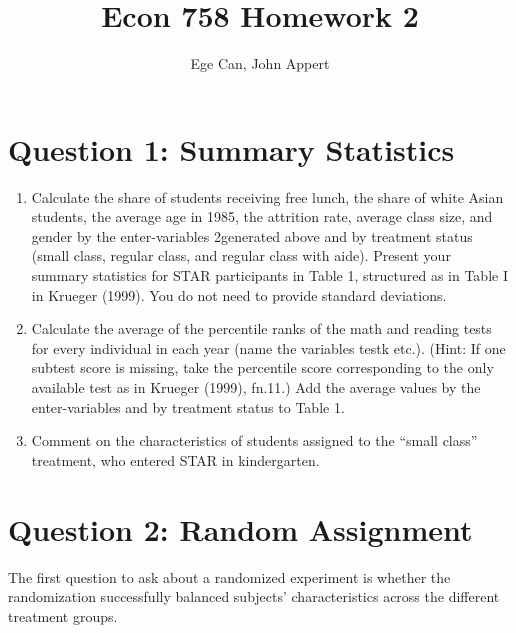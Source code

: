\documentclass{article}
\begin{document}
\title{Econ 758 Homework 2}
\author{Ege Can, John Appert}
\maketitle

\section{Question 1:  Summary Statistics}

\begin{enumerate}[label=\alph*]
\item Calculate the share of students receiving free lunch, the share of white Asian students, the average age in 1985, the attrition rate, average class size, and gender by the enter-variables 2generated above and by treatment status (small class, regular class, and regular class with aide). Present your summary statistics for STAR participants in Table 1, structured as in Table I in Krueger (1999). You do not need to provide standard deviations.

\item  Calculate the average of the percentile ranks of the math and reading tests for every individual in each year (name the variables testk etc.). (Hint: If one subtest score is missing, take the percentile score corresponding to the only available test as in Krueger (1999), fn.11.) Add the average values by the enter-variables and by treatment status to Table 1.

\item  Comment on the characteristics of students assigned to the “small class” treatment, who entered STAR in kindergarten.

\end{enumerate}

\section{Question 2:  Random Assignment}

The first question to ask about a randomized experiment is whether the randomization successfully balanced subjects’ characteristics across the different treatment groups.
\end{document}

